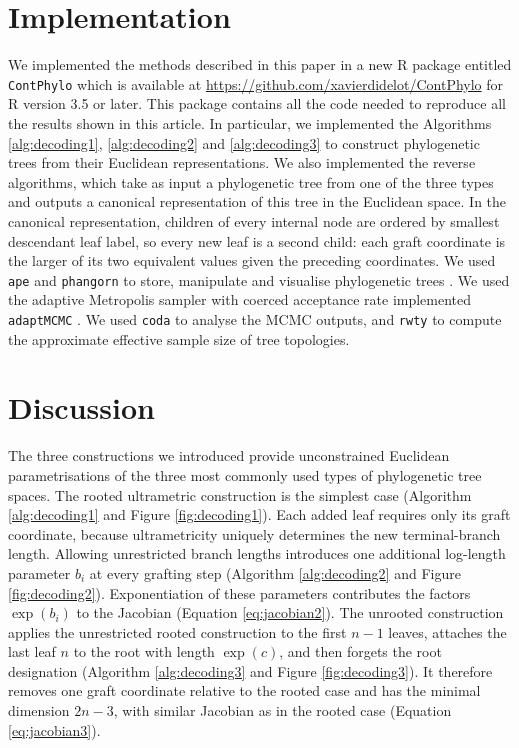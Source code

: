 \documentclass{article}
\begin{document}
\section{Implementation}

We implemented the methods described in this paper in a 
new R package entitled \verb+ContPhylo+ which is available
at \url{https://github.com/xavierdidelot/ContPhylo} for R version 3.5 or later. 
This package contains all the code needed to reproduce all the results shown in this article.
In particular, we implemented the Algorithms \ref{alg:decoding1}, \ref{alg:decoding2} and 
\ref{alg:decoding3} to construct phylogenetic trees from their Euclidean representations.
We also implemented the reverse algorithms, which take as input a phylogenetic tree
from one of the three types and outputs a canonical representation of this tree in the
Euclidean space. 
In the canonical representation, children of every internal node are ordered by smallest descendant leaf label, so every new leaf is a second child: each graft coordinate is the larger of its two equivalent values given the preceding coordinates. 
We used \verb+ape+ and \verb+phangorn+ to store, manipulate 
and visualise phylogenetic trees \citep{Paradis2019,schliepPhangornPhylogeneticAnalysis2011}.
We used the adaptive Metropolis sampler with coerced acceptance rate \citep{Vihola2012} 
implemented \verb+adaptMCMC+ \citep{adaptMCMC}. 
We used \verb+coda+ \citep{Plummer2006} to analyse the MCMC outputs, and 
\verb+rwty+ \citep{Warren2017} to compute the approximate effective sample size of tree topologies.

\section{Discussion}

The three constructions we introduced provide unconstrained Euclidean
parametrisations of the three most commonly used types of phylogenetic tree spaces. 
The rooted ultrametric construction is the simplest case (Algorithm \ref{alg:decoding1} 
and Figure \ref{fig:decoding1}). Each added
leaf requires only its graft coordinate, because ultrametricity uniquely
determines the new terminal-branch length. 
Allowing unrestricted branch lengths introduces one additional
log-length parameter $b_i$ at every grafting step (Algorithm \ref{alg:decoding2} 
and Figure \ref{fig:decoding2}). 
Exponentiation of
these parameters contributes the factors $\exp(b_i)$ to the Jacobian (Equation \ref{eq:jacobian2}).
The unrooted construction applies the unrestricted rooted construction
to the first $n-1$ leaves, attaches the last leaf $n$ to the
root with length $\exp(c)$, and then forgets the root designation (Algorithm \ref{alg:decoding3} 
and Figure \ref{fig:decoding3}). It
therefore removes one graft coordinate relative to the rooted case and
has the minimal dimension $2n-3$, with similar Jacobian as in the rooted case (Equation \ref{eq:jacobian3}).
\end{document}

